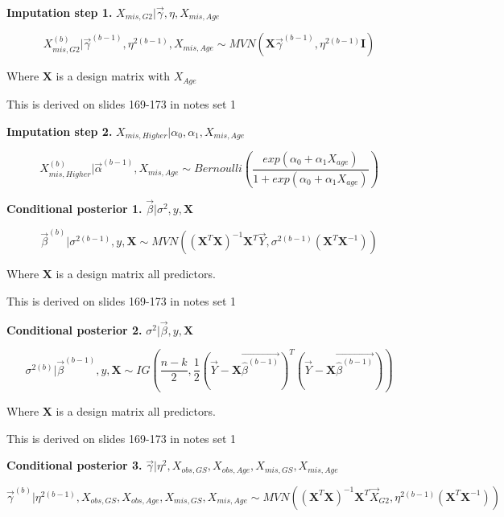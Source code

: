 \documentclass[11pt]{article}
\begin{document}
\vspace{0.25in}

\textbf{Imputation step 1.} $X_{mis, G2}|\vec\gamma, \eta, X_{mis, Age}$

$$X_{mis, G2}^{(b)}|\vec\gamma^{(b - 1)}, \eta^{2(b - 1)}, X_{mis, Age} \sim MVN(\mathbf{X}\vec{\gamma}^{(b - 1)}, \eta^{2(b - 1)}\mathbf{I})$$

Where $\mathbf{X}$ is a design matrix with $X_{Age}$

This is derived on slides 169-173 in notes set 1

\vspace{0.25in}

\textbf{Imputation step 2.} $X_{mis, Higher}|\alpha_0, \alpha_1, X_{mis, Age}$

$$X_{mis, Higher}^{(b)}|\vec\alpha^{(b - 1)}, X_{mis, Age} \sim Bernoulli\left(\frac{exp(\alpha_0 + \alpha_1X_{age})}{1 + exp(\alpha_0 + \alpha_1X_{age})}\right)$$

\textbf{Conditional posterior 1.} $\vec\beta | \sigma^2, y, \mathbf{X}$

$$\vec\beta^{(b)} | \sigma^{2(b - 1)}, y, \mathbf{X} \sim MVN((\mathbf{X}^T\mathbf{X})^{-1}\mathbf{X}^T\vec{Y}, \sigma^{2(b - 1)}(\mathbf{X}^T\mathbf{X}^{-1}))$$

Where $\mathbf{X}$ is a design matrix all predictors.

This is derived on slides 169-173 in notes set 1

\vspace{0.25in}

\textbf{Conditional posterior 2.} $\sigma^2 | \vec\beta, y, \mathbf{X}$

$$\sigma^{2(b)} | \vec\beta^{(b - 1)}, y, \mathbf{X} \sim IG\left(\frac{n - k}{2}, \frac{1}{2}(\vec{Y} - \mathbf{X}\vec{\hat\beta^{(b - 1)}})^T(\vec{Y} - \mathbf{X}\vec{\hat\beta^{(b - 1)}})\right)$$

Where $\mathbf{X}$ is a design matrix all predictors.

This is derived on slides 169-173 in notes set 1

\vspace{0.25in}

\textbf{Conditional posterior 3.} $\vec{\gamma}|\eta^2, X_{obs, GS}, X_{obs, Age}, X_{mis, GS}, X_{mis, Age}$

$$\vec{\gamma}^{(b)}|\eta^{2(b - 1)}, X_{obs, GS}, X_{obs, Age}, X_{mis, GS}, X_{mis, Age} \sim MVN((\mathbf{X}^T\mathbf{X})^{-1}\mathbf{X}^T\vec{X}_{G2}, \eta^{2(b - 1)}(\mathbf{X}^T\mathbf{X}^{-1}))$$
\end{document}
